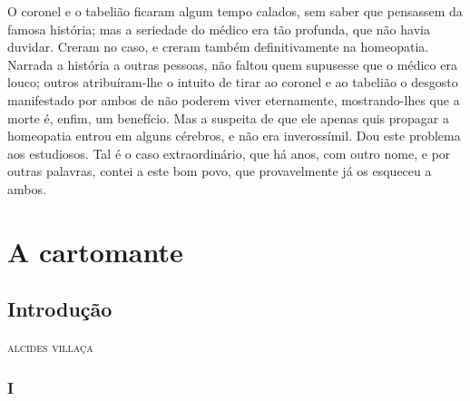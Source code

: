 O coronel e o tabelião ficaram algum tempo calados, sem saber que
pensassem da famosa história; mas a seriedade do médico era tão
profunda, que não havia duvidar. Creram no caso, e creram também
definitivamente na homeopatia. Narrada a história a outras pessoas, não
faltou quem supusesse que o médico era louco; outros atribuíram-lhe o
intuito de tirar ao coronel e ao tabelião o desgosto manifestado por
ambos de não poderem viver eternamente, mostrando-lhes que a morte é,
enfim, um benefício. Mas a suspeita de que ele apenas quis propagar a
homeopatia entrou em alguns cérebros, e não era inverossímil. Dou este
problema aos estudiosos. Tal é o caso extraordinário, que há anos, com
outro nome, e por outras palavras, contei a este bom povo, que
provavelmente já os esqueceu a ambos. 

\part{A cartomante}

\chapter[Introdução, \emph{por Alcides Villaça}]{Introdução}

\begin{flushright}
\textsc{alcides villaça}
\end{flushright}

\section{I}

